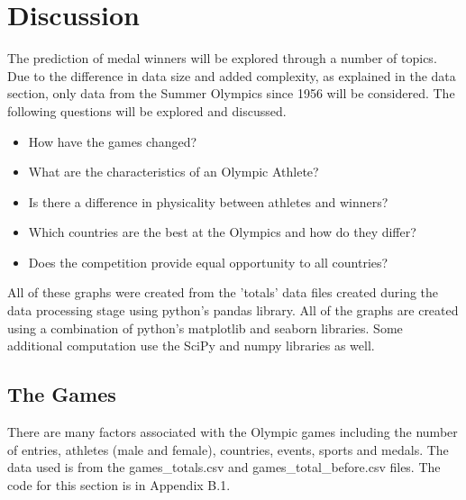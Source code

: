 \documentclass[a4 paper, 12pt]{article}
\begin{document}
\section{Discussion}
The prediction of medal winners will be explored through a number of topics. Due to the difference in data size and added complexity, as explained in the data section, only data from the Summer Olympics since 1956 will be considered. The following questions will be explored and discussed.
            \begin{itemize}
                \item How have the games changed?
                \item What are the characteristics of an Olympic Athlete?
                \item Is there a difference in physicality between athletes and winners?
                \item Which countries are the best at the Olympics and how do they differ?
                \item Does the competition provide equal opportunity to all countries?
            \end{itemize}
All of these graphs were created from the 'totals' data files created during the data processing stage using python's pandas library. All of the graphs are created using a combination of python's matplotlib and seaborn libraries. Some additional computation use the SciPy and numpy libraries as well.


    \subsection{The Games}
    There are many factors associated with the Olympic games including the number of entries, athletes (male and female), countries, events, sports and medals. The data used is from the games\_totals.csv and games\_total\_before.csv files. The code for this section is in Appendix B.1.
    
\end{document}
